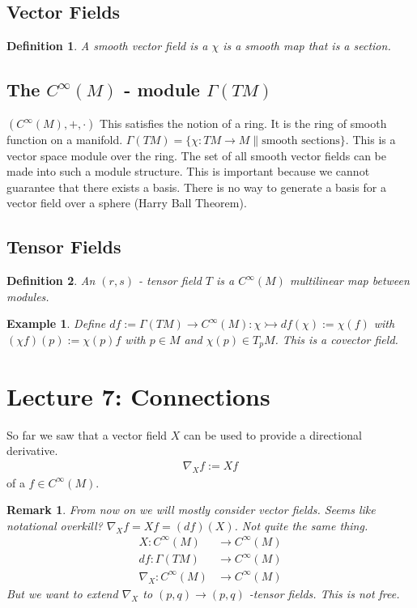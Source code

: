 \documentclass[10pt, oneside]{article}
\newtheorem{defn}{Definition}
\newtheorem{example}{Example}
\newtheorem{remark}{Remark}
\begin{document}
  \subsection{Vector Fields}
  \begin{defn}
     A smooth vector field is a $\chi$ is a smooth map that is a section.
  \end{defn}
  \subsection{The $C^\infty (M)$ - module $\Gamma (T M)$}
  $(C^{\infty} (M), +, \cdot)$ This satisfies the notion of a ring. It is the ring of smooth function on a manifold. $\Gamma (T M) = \{ \chi : T M \to M \| \text{smooth sections} \}$. This is a vector space module over the ring. The set of all smooth vector fields can be made into such a module structure. This is important because we cannot guarantee that there exists a basis. There is no way to generate a basis for a vector field over a sphere (Harry Ball Theorem).
  \subsection{Tensor Fields}
  \begin{defn}
     An $(r,s)$ - tensor field $T$ is a $C^{\infty} (M)$ multilinear map between modules.
  \end{defn}
  \begin{example}
     Define $df := \Gamma(T M) \to C^\infty (M): \chi \rightarrowtail df(\chi) := \chi (f)$ with $(\chi f)(p) := \chi (p) f $ with $p \in M$ and $\chi(p) \in T_p M$. This is a covector field.
  \end{example}
\section{Lecture 7: Connections \cite{Connections}}
 So far we saw that a vector field $X$ can be used to provide a directional derivative.
 \begin{align*}
     \nabla_X f := Xf
 \end{align*}
 of a $f \in C^\infty (M)$.
 \begin{remark}
  From now on we will mostly consider vector fields. Seems like notational overkill? $\nabla_X f = Xf = (df)(X)$. Not quite the same thing.
  \begin{align*}
     X: C^{\infty} (M) &\to C^{\infty} (M) \\
     df: \Gamma(T M) &\to C^\infty (M) \\
     \nabla_X: C^\infty (M) &\to C^\infty (M)
  \end{align*}
  But we want to extend $\nabla_X$ to $(p,q) \to (p,q)$ -tensor fields. This is not free.
 \end{remark}
\end{document}
